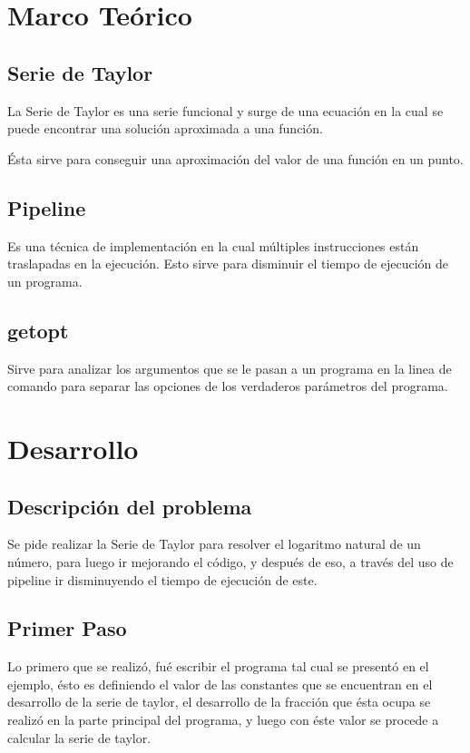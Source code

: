 \documentclass[12pt,letterpaper]{article}
\begin{document}
\section{Marco Teórico}
\subsection{Serie de Taylor}
La Serie de Taylor es una serie funcional y surge de una ecuación en la cual se puede encontrar una solución aproximada a una función.

Ésta sirve para conseguir una aproximación del valor de una función en un punto.

\subsection{Pipeline}
Es una técnica de implementación en la cual múltiples instrucciones están traslapadas en la ejecución. Esto sirve para disminuir el tiempo de ejecución de un programa.

\subsection{getopt}
Sirve para analizar los argumentos que se le pasan a un programa en la linea de comando para separar las opciones de los verdaderos parámetros del programa.
\newpage
\section{Desarrollo}
\subsection{Descripción del problema}
Se pide realizar la Serie de Taylor para resolver el logaritmo natural de un número, para luego ir mejorando el código, y después de eso, a través del uso de pipeline ir disminuyendo el tiempo de ejecución de este.

\subsection{Primer Paso}
Lo primero que se realizó, fué escribir el programa tal cual se presentó en el ejemplo, ésto es definiendo el valor de las constantes que se encuentran en el desarrollo de la serie de taylor, el desarrollo de la fracción que ésta ocupa se realizó en la parte principal del programa, y luego con éste valor se procede a calcular la serie de taylor.
\end{document}
